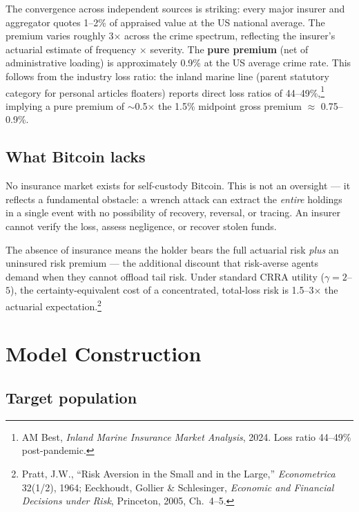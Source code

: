 \documentclass[a4paper,11pt]{article}
\begin{document}
\noindent The convergence across independent sources is striking: every major insurer and aggregator quotes 1--2\% of appraised value at the US national average. The premium varies roughly 3$\times$ across the crime spectrum, reflecting the insurer's actuarial estimate of frequency $\times$ severity. The \textbf{pure premium} (net of administrative loading) is approximately 0.9\% at the US average crime rate. This follows from the industry loss ratio: the inland marine line (parent statutory category for personal articles floaters) reports direct loss ratios of 44--49\%,\footnote{AM Best, \textit{Inland Marine Insurance Market Analysis}, 2024. Loss ratio 44--49\% post-pandemic.} implying a pure premium of $\sim$0.5$\times$ the 1.5\% midpoint gross premium $\approx$ 0.75--0.9\%.

\subsection{What Bitcoin lacks}

No insurance market exists for self-custody Bitcoin. This is not an oversight --- it reflects a fundamental obstacle: a wrench attack can extract the \textit{entire} holdings in a single event with no possibility of recovery, reversal, or tracing. An insurer cannot verify the loss, assess negligence, or recover stolen funds.

The absence of insurance means the holder bears the full actuarial risk \textit{plus} an uninsured risk premium --- the additional discount that risk-averse agents demand when they cannot offload tail risk. Under standard CRRA utility ($\gamma = 2$--$5$), the certainty-equivalent cost of a concentrated, total-loss risk is 1.5--3$\times$ the actuarial expectation.\footnote{Pratt, J.W., ``Risk Aversion in the Small and in the Large,'' \textit{Econometrica} 32(1/2), 1964; Eeckhoudt, Gollier \& Schlesinger, \textit{Economic and Financial Decisions under Risk}, Princeton, 2005, Ch.\ 4--5.}

\section{Model Construction}

\subsection{Target population}
\end{document}
